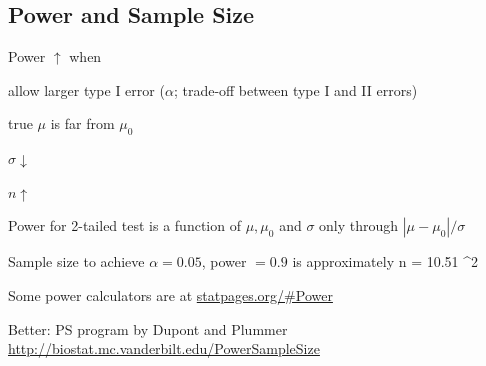 \subsection{Power and Sample Size} 
\bi
\item Power $\uparrow$ when
 \bi
 \item allow larger type I error ($\alpha$; trade-off between type I
   and II errors)
 \item true $\mu$ is far from $\mu_{0}$
 \item $\sigma \downarrow$
 \item $n \uparrow$
 \ei
\item Power for 2-tailed test is a function of $\mu, \mu_{0}$ and
  $\sigma$ only through  $|\mu - \mu_{0}| / \sigma$
\item Sample size to achieve $\alpha=0.05$, power $=0.9$ is approximately
\beq
n = 10.51 ^{2}
\eeq
\item Some power calculators are at \url{statpages.org/#Power}
\item Better: PS program by Dupont and Plummer \url{http://biostat.mc.vanderbilt.edu/PowerSampleSize}

